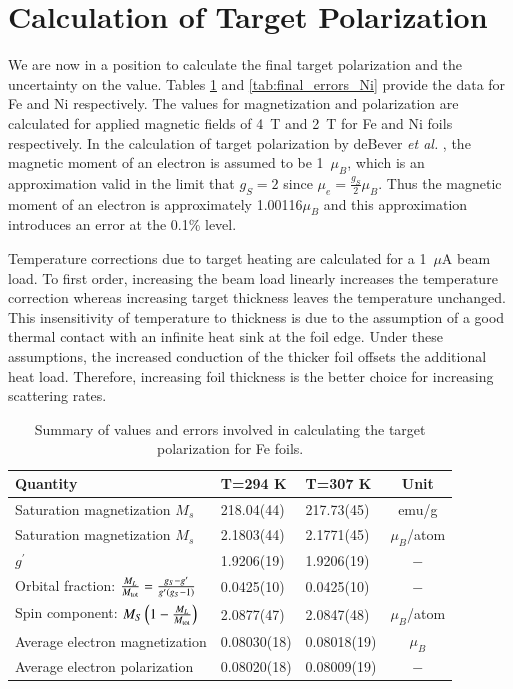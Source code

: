 \documentclass[preprint,12pt]{elsarticle}
\begin{document}
{\section{Calculation of Target Polarization}\label{sec:final_calc}
We are now in a position to calculate the final target polarization and the uncertainty on the value. Tables \ref{tab:final_errors_Fe} and \ref{tab:final_errors_Ni} provide the data for Fe and Ni respectively. The values for magnetization and polarization are calculated for applied magnetic fields of 4~T and 2~T for Fe and Ni foils respectively. In the calculation of target polarization by deBever {\it et al.} \cite{deBever1997}, the magnetic moment of an electron is assumed to be 1~$\mu_B$, which is an approximation valid in the limit that $g_{S}=2$ since $\mu_e=\frac{g_S}{2}\mu_B$. Thus the magnetic moment of an electron is approximately 1.00116$\mu_B$ and this approximation introduces an error at the 0.1\% level. %


Temperature corrections due to target heating are calculated for a 1~$\mu$A beam load. To first order, increasing the beam load linearly increases the temperature correction whereas increasing target thickness leaves the temperature unchanged. This insensitivity of temperature to thickness is due to the assumption of a good thermal contact with an infinite heat sink at the foil edge. Under these assumptions, the increased conduction of the thicker foil offsets the additional heat load. Therefore, increasing foil thickness is the better choice for increasing scattering rates. 
\begin{table}[h]
\caption{\label{tab:final_errors_Fe}Summary of values and errors involved in calculating the target polarization for Fe foils.}
\begin{center}
\begin{tabular}{|l|l|l|c|}\hline
Quantity&T=294 K&T=307 K&Unit\\\hline
Saturation magnetization $M_s$ &218.04(44)&217.73(45)&emu/g\\
Saturation magnetization $M_s$&2.1803(44)&2.1771(45)&$\mu_B$/atom\\
$g^{\prime}$&1.9206(19)&1.9206(19)&$-$\\
Orbital fraction: $\frac{M_{L}}{M_{\rm tot}}=\frac{g_{S}-g^\prime}{g^\prime(g_{S}-1)}$&0.0425(10)&0.0425(10)&$-$\\
Spin component: $M_S\left(1-\frac{M_{L}}{M_{\rm tot}}\right)$&2.0877(47)&2.0847(48)&$\mu_B$/atom\\
Average electron magnetization&0.08030(18)&0.08018(19)&$\mu_B$\\
Average electron polarization&0.08020(18)&0.08009(19)&$-$\\\hline
\end{tabular}
\end{center}
\end{table}


}
\end{document}
